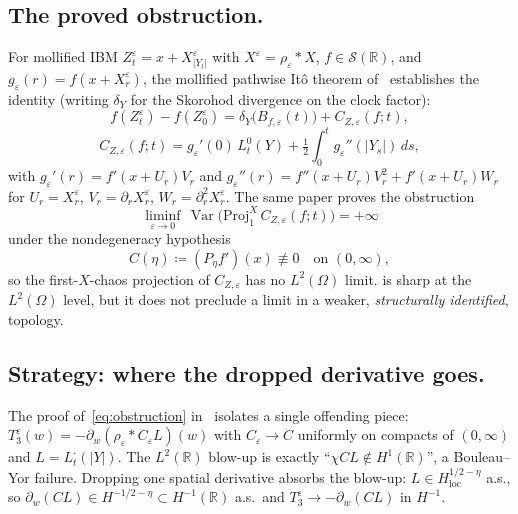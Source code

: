 \documentclass[11pt,reqno]{amsart}
\theoremstyle{plain}
\theoremstyle{definition}
\theoremstyle{remark}
\newcommand{\R}{\mathbb{R}}
\newcommand{\IBM}{Z}
\DeclareMathOperator{\Var}{Var}
\begin{document}
\subsection*{The proved obstruction.}
For mollified IBM $\IBM_{t}^{\varepsilon}=x+X^{\varepsilon}_{|Y_{t}|}$
with $X^{\varepsilon}=\rho_{\varepsilon}*X$,
$f\in\mathscr S(\R)$, and
$g_{\varepsilon}(r)=f(x+X^{\varepsilon}_{r})$, the mollified pathwise
It\^o theorem of~\cite{Fontes-EnergyFirst} establishes the identity
(writing $\delta_{Y}$ for the Skorohod divergence on the clock
factor):
\begin{equation}\label{eq:flagship}
 f(\IBM_{t}^{\varepsilon})-f(\IBM_{0}^{\varepsilon})
  =\delta_{Y}\bigl(B_{f,\varepsilon}(t)\bigr)+C_{\IBM,\varepsilon}(f;t),
\end{equation}
\begin{equation}\label{eq:Ceps}
 C_{\IBM,\varepsilon}(f;t)
  =g_{\varepsilon}'(0)\,L_{t}^{0}(Y)
  +\tfrac12\!\int_{0}^{t}g_{\varepsilon}''(|Y_{s}|)\,ds,
\end{equation}
with $g_{\varepsilon}'(r)=f'(x+U_{r})V_{r}$ and
$g_{\varepsilon}''(r)=f''(x+U_{r})V_{r}^{2}+f'(x+U_{r})W_{r}$ for
$U_{r}=X^{\varepsilon}_{r}$, $V_{r}=\partial_{r}X^{\varepsilon}_{r}$,
$W_{r}=\partial_{r}^{2}X^{\varepsilon}_{r}$. The same paper proves
the obstruction
\begin{equation}\label{eq:obstruction}
 \liminf_{\varepsilon\to 0}\,
 \Var\bigl(\mathrm{Proj}_{1}^{X}\,C_{\IBM,\varepsilon}(f;t)\bigr)
  =+\infty
\end{equation}
under the nondegeneracy hypothesis
\begin{equation}\label{eq:nondegen}
 C(\eta)\coloneqq(P_{\eta}f')(x)\not\equiv 0
 \quad\text{on }(0,\infty),
\end{equation}
so the first-$X$-chaos projection of $C_{\IBM,\varepsilon}$ has no
$L^{2}(\Omega)$ limit.  is sharp at the
$L^{2}(\Omega)$ level, but it does not preclude a limit in a weaker,
\emph{structurally identified}, topology.

\subsection*{Strategy: where the dropped derivative goes.}
The proof of~\eqref{eq:obstruction} in~\cite{Fontes-EnergyFirst}
isolates a single offending piece:
$T_{3}^{\varepsilon}(w)=-\partial_{w}(\rho_{\varepsilon}*C_{\varepsilon}L)(w)$
with $C_{\varepsilon}\to C$ uniformly on compacts of $(0,\infty)$ and
$L=L_{t}^{\cdot}(|Y|)$. The $L^{2}(\R)$ blow-up is exactly
``$\chi C L\notin H^{1}(\R)$'', a Bouleau--Yor failure. Dropping one
spatial derivative absorbs the blow-up:
$L\in H^{1/2-\eta}_{\mathrm{loc}}$ a.s., so
$\partial_{w}(CL)\in H^{-1/2-\eta}\subset H^{-1}(\R)$ a.s.\ and
$T_{3}^{\varepsilon}\to-\partial_{w}(CL)$ in $H^{-1}$.
\end{document}

